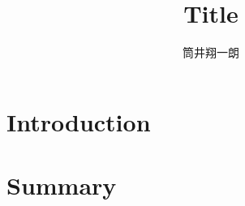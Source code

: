 \documentclass[]{ltjsarticle}
\begin{document}
\title{Title}


\author{筒井翔一朗}


\maketitle
\tableofcontents


\section{Introduction}


\section{Summary}


%
%
\end{document}
